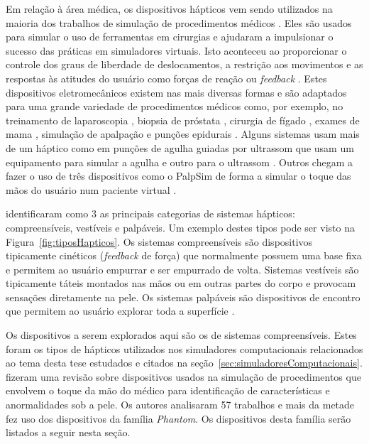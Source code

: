 Em relação à área médica, os dispositivos hápticos vem sendo utilizados na maioria dos trabalhos de simulação de procedimentos médicos \cite{Escobar-Castillejos2016, Moo-Young2021}. Eles são usados para simular o uso de ferramentas em cirurgias e ajudaram a impulsionar o sucesso das práticas em simuladores virtuais. Isto aconteceu ao proporcionar o controle dos graus de liberdade de deslocamentos, a restrição aos movimentos e as respostas às atitudes do usuário como forças de reação ou \textit{feedback} \cite{Gerovich2004}. Estes dispositivos eletromecânicos existem nas mais diversas formas e são adaptados para uma grande variedade de procedimentos médicos como, por exemplo, no treinamento de laparoscopia \cite{Srinivasan2004}, biopsia de próstata \cite{Sclaverano2009}, cirurgia de fígado \cite{Mastmeyer2016}, exames de mama \cite{Brazil2017,Jeon2010,Ribeiro2014,Solanki2010}, simulação de apalpação \cite{Ribeiro2016} e punções epidurais \cite{N.2013, Brazil2018}. Alguns sistemas usam mais de um háptico como em punções de agulha guiadas por ultrassom que usam um equipamento para simular a agulha e outro para o ultrassom \cite{Ni2011,Vidal2008}. Outros chegam a fazer o uso de três dispositivos como o PalpSim de forma a simular o toque das mãos do usuário num paciente virtual \cite{Coles2011b}. 

\textcite{Culbertson2018} identificaram como 3 as principais categorias de sistemas hápticos: compreensíveis, vestíveis e palpáveis. Um exemplo  destes tipos pode ser visto na Figura~\ref{fig:tiposHapticos}. Os sistemas compreensíveis são dispositivos tipicamente cinéticos (\textit{feedback} de força) que normalmente possuem uma base fixa e permitem ao usuário empurrar e ser empurrado de volta. Sistemas vestíveis são tipicamente táteis montados nas mãos ou em outras partes do corpo e provocam sensações diretamente na pele. Os sistemas palpáveis são dispositivos de encontro que permitem ao usuário explorar toda a superfície \cite{Culbertson2018}. 

Os dispositivos a serem explorados aqui são os de sistemas compreensíveis. Estes foram os tipos de hápticos utilizados nos simuladores computacionais relacionados ao tema desta tese estudados e citados na seção~\ref{sec:simuladoresComputacionais}. \textcite{Ribeiro2016} fizeram uma revisão sobre dispositivos usados na simulação de procedimentos que envolvem o toque da mão do médico para identificação de características e anormalidades sob a pele. Os autores analisaram 57 trabalhos e mais da metade fez uso dos dispositivos da família \textit{Phantom}. Os dispositivos desta família serão listados a seguir nesta seção.

